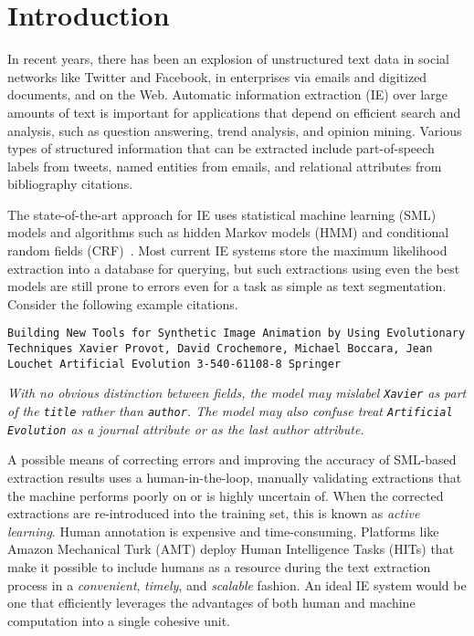 \section{Introduction}

In recent years, there has been an explosion of unstructured text data in
social networks like Twitter and Facebook, in enterprises via emails and
digitized documents, and on the Web.
Automatic information extraction (IE) over large amounts of text is important
for applications that depend on efficient search and analysis, such as
question answering, trend analysis, and opinion mining.
Various types of structured information that can be extracted
include part-of-speech labels from tweets, named entities from emails, and
relational attributes from bibliography citations.

The state-of-the-art approach for IE uses statistical machine learning (SML)
models and algorithms such as hidden Markov models (HMM) and conditional random
fields (CRF)~\cite{DBLP:conf/icml/LaffertyMP01}.  Most current IE systems
store the maximum likelihood extraction into a database for querying, but such
extractions using even the best models are still prone to errors even for a
task as simple as text segmentation. Consider the following example citations.
\begin{example}
\label{ex:citation} 
\begin{sloppypar}
\vspace{2mm} 
\noindent \texttt{Building New Tools for Synthetic Image 
Animation by Using Evolutionary Techniques Xavier 
Provot, David Crochemore, Michael Boccara, Jean
Louchet Artificial Evolution 3-540-61108-8 Springer} 
\vspace{2mm}
\end{sloppypar}
\noindent \textit{With no obvious distinction between fields, the model may mislabel \texttt{Xavier} as part of the \texttt{title} rather than \texttt{author}.
The model may also confuse treat \texttt{Artificial Evolution} as a \emph{journal} attribute or as the last \emph{author} attribute.}
\rbox
\end{example}

A possible means of correcting errors and improving the accuracy of SML-based
extraction results uses a human-in-the-loop, manually validating extractions
that the machine performs poorly on or is highly uncertain of.  When the
corrected extractions are re-introduced into the training set, this is known as
\textit{active learning}.
Human annotation is expensive and time-consuming.  Platforms like Amazon
Mechanical Turk (AMT) deploy Human Intelligence Tasks (HITs) that make it
possible to include humans as a resource during the text
extraction process in a \textit{convenient}, \textit{timely}, and
\textit{scalable} fashion.  An ideal IE system would be one that efficiently
leverages the advantages of both human and machine computation
\cite{DBLP:journals/pvldb/WangKFF12,quinn10} into a single cohesive unit.


